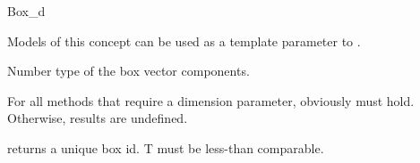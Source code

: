 

\ccRefPageBegin
\begin{ccRefConcept}{Box_d}

\ccDefinition
Models of this concept can be used as a template parameter to .

\ccTypes
{}  {Number type of the box vector components.}

\ccOperations
For all methods that require a dimension parameter, obviously  must hold. Otherwise, results are undefined.

 {returns a unique box id. T must be less-than comparable.}

\end{ccRefConcept}


\ccRefPageEnd
